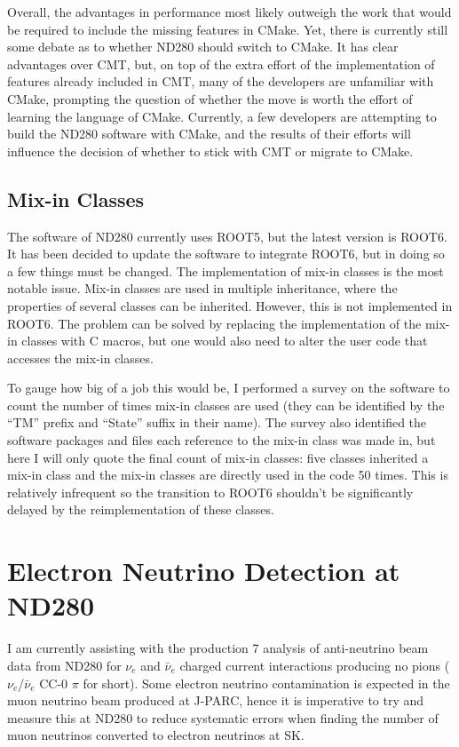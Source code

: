 \documentclass[aps,pra,12pt,notitlepage,tightenlines]{revtex4-1}
\newcommand{\nue}{$\nu_e$ }
\newcommand{\anue}{$\bar\nu_e$ }
\begin{document}
Overall, the advantages in performance most likely outweigh the work that would be required to include the missing features in CMake. Yet, there is currently still some debate as to whether ND280 should switch to CMake. It has clear advantages over CMT, but, on top of the extra effort of the implementation of features already included in CMT, many of the developers are unfamiliar with CMake, prompting the question of whether the move is worth the effort of learning the language of CMake. Currently, a few developers are attempting to build the ND280 software with CMake, and the results of their efforts will influence the decision of whether to stick with CMT or migrate to CMake.

\subsection{Mix-in Classes}
The software of ND280 currently uses ROOT5, but the latest version is ROOT6. It has been decided to update the software to integrate ROOT6, but in doing so a few things must be changed. The implementation of mix-in classes is the most notable issue. Mix-in classes are used in multiple inheritance, where the properties of several classes can be inherited. However, this is not implemented in ROOT6. The problem can be solved by replacing the implementation of the mix-in classes with C macros, but one would also need to alter the user code that accesses the mix-in classes.

To gauge how big of a job this would be, I performed a survey on the software to count the number of times mix-in classes are used (they can be identified by the ``TM'' prefix and ``State'' suffix in their name). The survey also identified the software packages and files each reference to the mix-in class was made in, but here I will only quote the final count of mix-in classes: five classes inherited a mix-in class and the mix-in classes are directly used in the code 50 times. This is relatively infrequent so the transition to ROOT6 shouldn't be significantly delayed by the reimplementation of these classes.

\section{Electron Neutrino Detection at ND280}
I am currently assisting with the production 7 analysis of anti-neutrino beam data from ND280 for \nue and \anue charged current interactions producing no pions ($\nu_e$/\anue CC-0 $\pi$ for short). Some electron neutrino contamination is expected in the muon neutrino beam produced at J-PARC, hence it is imperative to try and measure this at ND280 to reduce systematic errors when finding the number of muon neutrinos converted to electron neutrinos at SK.
\end{document}
